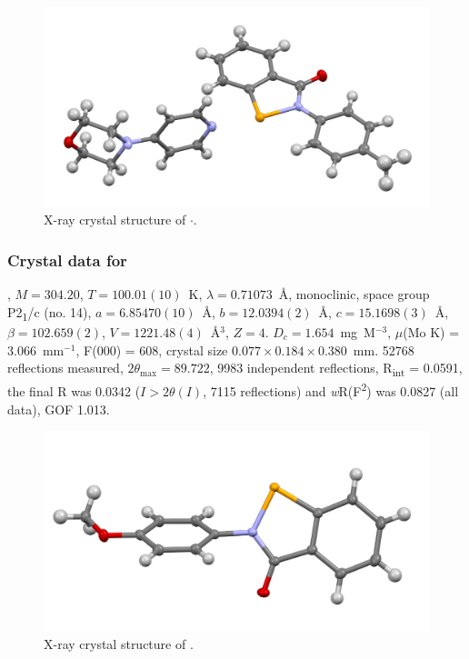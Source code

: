 \begin{refsection}
\begin{figure}
  \includegraphics[width=0.6\linewidth]{Figures/ebs-4me-morph-xtal.pdf}
  \caption{X-ray crystal structure of \texorpdfstring{$\cdot$}{C23 H23 N3 O2 Se}.}
\end{figure}

\subsubsection{Crystal data for \texorpdfstring{}{C14 H11 N O2 Se}}
, $M=304.20$, $T=100.01(10)$~K, $\lambda=0.71073$~\AA, monoclinic, space group P2\textsubscript{1}/c (no. 14), $a = 6.85470(10)$~\AA, $b = 12.0394(2)$~\AA, $c = 15.1698(3)$~\AA, $\beta = 102.659(2)$\degree, $V = 1221.48(4)$~\AA$^{3}$, $Z = 4$. $D_{c}= 1.654$~mg~M$^{-3}$, $\mu$(Mo K\a) = 3.066~mm$^{-1}$, F(000) = 608, crystal size $0.077 \times 0.184 \times 0.380$~mm. 52768 reflections measured, $2\theta_{\mathrm{max}}=89.722$\degree, 9983 independent reflections, R\textsubscript{int} = 0.0591, the final R was 0.0342 ($I > 2\theta(I)$, 7115 reflections) and \emph{w}R(F\textsuperscript{2}) was 0.0827 (all data), GOF 1.013.

\begin{figure}
  \includegraphics[width=0.6\linewidth]{Figures/ebs-4ome-xtal.pdf}
  \caption{X-ray crystal structure of \texorpdfstring{}{C14 H11 N O2 Se}.}
\end{figure}


\end{refsection}
